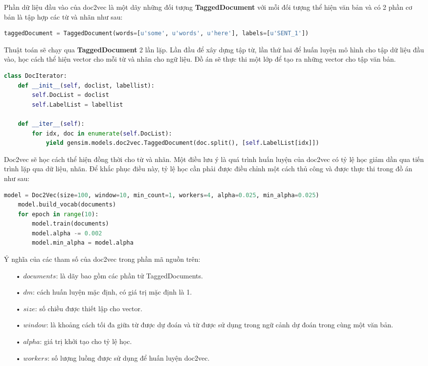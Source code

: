 Phần dữ liệu đầu vào của doc2vec là một dãy những đối tượng \textbf{TaggedDocument} với mỗi đối tượng thể hiện văn bản và có 2 phần cơ bản là tập hợp các từ và nhãn như sau:
\begin{lstlisting}[language=Python]
taggedDocument = TaggedDocument(words=[u'some', u'words', u'here'], labels=[u'SENT_1'])
\end{lstlisting}

Thuật toán sẽ chạy qua \textbf{TaggedDocument} 2 lần lặp.
Lần đầu để xây dựng tập từ, lần thứ hai để huấn luyện mô hình cho tập dữ liệu đầu vào, học cách thể hiện vector cho mỗi từ và nhãn cho ngữ liệu.
Đồ án sẽ thực thi một lớp để tạo ra những vector cho tập văn bản.
\begin{lstlisting}[language=Python]
class DocIterator:
    def __init__(self, doclist, labellist):
        self.DocList = doclist
        self.LabelList = labellist

    def __iter__(self):
        for idx, doc in enumerate(self.DocList):
            yield gensim.models.doc2vec.TaggedDocument(doc.split(), [self.LabelList[idx]])
\end{lstlisting}

Doc2vec sẽ học cách thể hiện đồng thời cho từ và nhãn.
Một điều lưu ý là quá trình huấn luyện của doc2vec có tỷ lệ học giảm dần qua tiến trình lặp qua dữ liệu, nhãn.
Để khắc phục điều này, tỷ lệ học cần phải được điều chỉnh một cách thủ công và được thực thi trong đồ án như sau:
\label{code:training}
\begin{lstlisting}[language=Python]
model = Doc2Vec(size=100, window=10, min_count=1, workers=4, alpha=0.025, min_alpha=0.025)
    model.build_vocab(documents)
    for epoch in range(10):
        model.train(documents)
        model.alpha -= 0.002
        model.min_alpha = model.alpha
\end{lstlisting}

Ý nghĩa của các tham số của doc2vec trong phần mã nguồn trên:
\begin{enumerate}
\item[•]$documents$: là dãy bao gồm các phần tử TaggedDocuments.
\item[•]$dm$: cách huấn luyện mặc định, có giá trị mặc định là 1.
\item[•]$size$: số chiều được thiết lập cho vector.
\item[•]$window$: là khoảng cách tối đa giữa từ được dự đoán và từ được sử dụng trong ngữ cảnh dự đoán trong cùng một văn bản.
\item[•]$alpha$: giá trị khởi tạo cho tỷ lệ học.
\item[•]$workers$:  số lượng luồng được sử dụng để huấn luyện doc2vec.
\end{enumerate}

